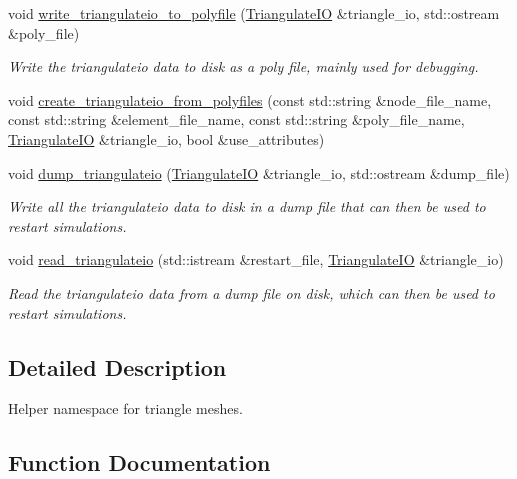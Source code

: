 \begin{DoxyCompactItemize}
void \hyperlink{namespaceoomph_1_1TriangleHelper_aac66d74842d8c3600be11d2845f4e4a5}{write\+\_\+triangulateio\+\_\+to\+\_\+polyfile} (\hyperlink{structoomph_1_1TriangulateIO}{Triangulate\+IO} \&triangle\+\_\+io, std\+::ostream \&poly\+\_\+file)
\begin{DoxyCompactList}\small\item\em Write the triangulateio data to disk as a poly file, mainly used for debugging. \end{DoxyCompactList}\item 
void \hyperlink{namespaceoomph_1_1TriangleHelper_a5eb84bc982fe19b2f5fab0ea7a26cd78}{create\+\_\+triangulateio\+\_\+from\+\_\+polyfiles} (const std\+::string \&node\+\_\+file\+\_\+name, const std\+::string \&element\+\_\+file\+\_\+name, const std\+::string \&poly\+\_\+file\+\_\+name, \hyperlink{structoomph_1_1TriangulateIO}{Triangulate\+IO} \&triangle\+\_\+io, bool \&use\+\_\+attributes)
\item 
void \hyperlink{namespaceoomph_1_1TriangleHelper_a86bf54d4c238d866b9cbec1377e868bd}{dump\+\_\+triangulateio} (\hyperlink{structoomph_1_1TriangulateIO}{Triangulate\+IO} \&triangle\+\_\+io, std\+::ostream \&dump\+\_\+file)
\begin{DoxyCompactList}\small\item\em Write all the triangulateio data to disk in a dump file that can then be used to restart simulations. \end{DoxyCompactList}\item 
void \hyperlink{namespaceoomph_1_1TriangleHelper_a9b95d3b41c921cd6d8804250a366f715}{read\+\_\+triangulateio} (std\+::istream \&restart\+\_\+file, \hyperlink{structoomph_1_1TriangulateIO}{Triangulate\+IO} \&triangle\+\_\+io)
\begin{DoxyCompactList}\small\item\em Read the triangulateio data from a dump file on disk, which can then be used to restart simulations. \end{DoxyCompactList}\end{DoxyCompactItemize}


\subsection{Detailed Description}
Helper namespace for triangle meshes. 

\subsection{Function Documentation}
\mbox{\label{namespaceoomph_1_1TriangleHelper_adb064d7ba88f96c699c26d21b42bca7a}} 
